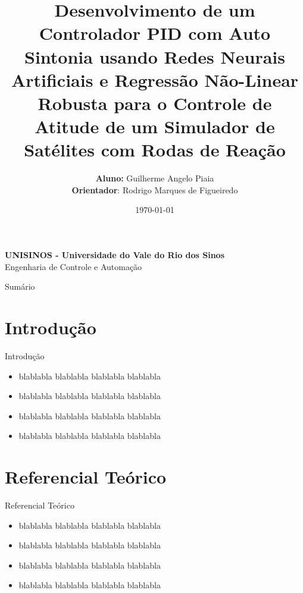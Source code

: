 \documentclass{beamer}
\title[ Desenvolvimento de um Controlador PID com Auto Sintonia usando Redes Neurais Artificiais e Regressão ...]{Desenvolvimento de um Controlador PID com Auto Sintonia usando Redes Neurais Artificiais e Regressão Não-Linear Robusta para o Controle de Atitude de um Simulador de Satélites com
Rodas de Reação}
\author[Piaia, G. A.]{
	{\fontsize{10}{8}\selectfont \textbf{Aluno:} Guilherme Angelo Piaia} \\
	{\fontsize{10}{8}\selectfont \textbf{Orientador}: Rodrigo Marques de Figueiredo}
}
\date{\today}
\begin{document}

\begin{frame}
	\begin{minipage}{1\linewidth}
		\centering
		    \textbf{UNISINOS - Universidade do Vale do Rio dos Sinos} \\ Engenharia de Controle e Automação
	\end{minipage}
	\titlepage
\end{frame}


\begin{frame}{Sumário}
	\tableofcontents
\end{frame}


\section{Introdução}
\begin{frame}{Introdução}
	\begin{itemize}
		\justifying
		\item blablabla blablabla blablabla blablabla 
		\item blablabla blablabla blablabla blablabla 
		\item blablabla blablabla blablabla blablabla 
		\item blablabla blablabla blablabla blablabla 
    \end{itemize}
\end{frame}

\section{Referencial Teórico}
\begin{frame}{Referencial Teórico}
	\begin{itemize}
		\justifying
		\item blablabla blablabla blablabla blablabla 
		\item blablabla blablabla blablabla blablabla 
		\item blablabla blablabla blablabla blablabla 
		\item blablabla blablabla blablabla blablabla 
	\end{itemize}
\end{frame}

\end{document}
